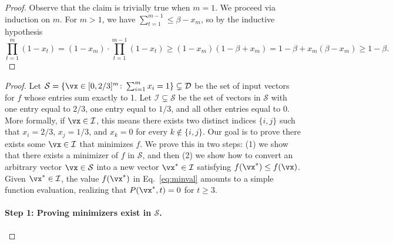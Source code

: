 \lemsumtoprod*
\begin{proof}
	Observe that the claim is trivially true when $m = 1$. We proceed via induction on $m$. For $m > 1$, we have $\sum_{t = 1}^{m - 1} \leq \beta - x_m$, so by the inductive hypothesis
	\[ \prod_{t = 1}^m (1 - x_t) = (1 - x_m)\cdot \prod_{t=1}^{m-1}(1 - x_t) \geq (1 - x_m)(1 - \beta + x_m) = 1 - \beta + x_m(\beta - x_m) \geq 1 - \beta.\]
\end{proof}

\lembounding*
\begin{proof}
	Let $\mathcal{S} = \{\vx \in [0,2/3]^m \colon \sum_{i = 1}^m x_i = 1\} \subsetneq \mathcal{D}$ be the set of input vectors for $f$ whose entries sum exactly to 1. Let $\mathcal{I}\subsetneq \mathcal{S}$ be the set of vectors in $\mathcal{S}$ with one entry equal to $2/3$, one entry equal to $1/3$, and all other entries equal to 0. More formally, if $\vx \in \mathcal{I}$, this means there exists two distinct indices $\{i,j\}$ such that $x_i = 2/3$, $x_j = 1/3$, and $x_k = 0$ for every $k \notin \{i,j\}$. Our goal is to prove there exists some $\vx \in \mathcal{I}$ that minimizes $f$. We prove this in two steps: (1) we show that there exists a minimizer of $f$ in $\mathcal{S}$, and then (2) we show how to convert an arbitrary vector $\vx \in \mathcal{S}$ into a new vector $\vx^* \in \mathcal{I}$ satisfying $f(\vx^*) \leq f(\vx)$. Given $\vx^* \in \mathcal{I}$, the value $f(\vx^*)$ in Eq.~\eqref{eq:minval} amounts to a simple function evaluation, realizing that $P(\vx^*,t) = 0$ for $t \geq 3$.

	\paragraph{Step 1: Proving minimizers exist in $\mathcal{S}$.}


\end{proof}
